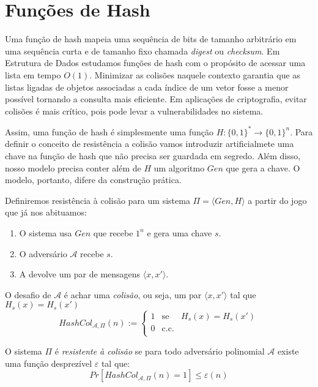 \chapter{Funções de Hash}
\label{cha:hash}

Uma função de hash mapeia uma sequência de bits de tamanho arbitrário em uma sequência curta e de tamanho fixo chamada {\em digest} ou {\em checksum}.
Em Estrutura de Dados estudamos funções de hash com o propósito de acessar uma lista em tempo $O(1)$.
Minimizar as colisões naquele contexto garantia que as listas ligadas de objetos associadas a cada índice de um vetor fosse a menor possível tornando a consulta mais eficiente.
Em aplicações de criptografia, evitar colisões é mais crítico, pois pode levar a vulnerabilidades no sistema.

Assim, uma função de hash é simplesmente uma função $H: \{0,1\}^* \to \{0,1\}^n$.
Para definir o conceito de resistência a colisão vamos introduzir artificialmete uma chave na função de hash que não precisa ser guardada em segredo.
Além disso, nosso modelo precisa conter além de $H$ um algoritmo $Gen$ que gera a chave.
O modelo, portanto, difere da construção prática.

Definiremos resistência à colisão para um sistema $\Pi = \langle Gen, H \rangle$ a partir do jogo que já nos abituamos:
\begin{enumerate}
\item O sistema usa $Gen$ que recebe $1^n$ e gera uma chave $s$.
\item O adversário $\mathcal{A}$ recebe $s$.
\item A devolve um par de mensagens $\langle x, x' \rangle$.
\end{enumerate}

O desafio de $\mathcal{A}$ é achar uma {\em colisão}, ou seja, um par $\langle x, x' \rangle$ tal que $H_s(x) = H_s(x')$
\begin{displaymath}
  HashCol_{\mathcal{A}, \Pi}(n) := \left\{
    \begin{array}{lcl}
      1 & \textrm{se} & H_s(x) = H_s(x')\\
      0 & \textrm{c.c.} &\\
    \end{array}
    \right.
\end{displaymath}

O sistema $\Pi$ é {\em resistente à colisão} se para todo adversário polinomial $\mathcal{A}$ existe uma função desprezível $\varepsilon$ tal que:
\begin{displaymath}
  Pr[HashCol_{\mathcal{A}, \Pi}(n) = 1] \leq \varepsilon(n)
\end{displaymath}

